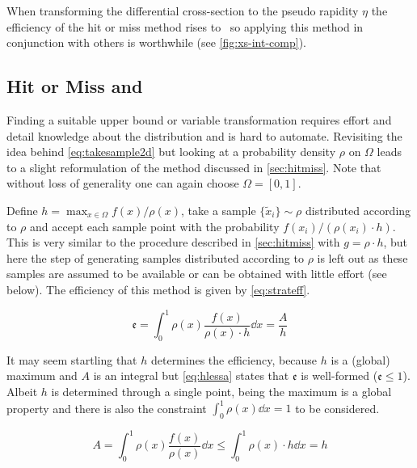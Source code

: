 When transforming the differential cross-section to the pseudo
rapidity \(\eta\) the efficiency of the hit or miss method rises
to~ so applying this method in conjunction
with others is worthwhile (see \cref{fig:xs-int-comp}).

\subsection{Hit or Miss and \vegas}%
\label{sec:stratsamp}

Finding a suitable upper bound or variable transformation requires
effort and detail knowledge about the distribution and is hard to
automate. Revisiting the idea behind \cref{eq:takesample2d} but
looking at a probability density \(\rho\) on \(\Omega\) leads to a
slight reformulation of the method discussed in
\cref{sec:hitmiss}. Note that without loss of generality one can again
choose \(\Omega = [0, 1]\).

Define \(h=\max_{x\in\Omega}f(x)/\rho(x)\), take a sample
\(\{\tilde{x}_i\}\sim\rho\) distributed according to \(\rho\) and
accept each sample point with the probability
\(f(x_i)/(\rho(x_i)\cdot h)\).  This is very similar to the procedure
described in \cref{sec:hitmiss} with \(g=\rho\cdot h\), but here the
step of generating samples distributed according to \(\rho\) is left
out as these samples are assumed to be available or can be obtained
with little effort (see below). The efficiency of this method is given
by \cref{eq:strateff}.

\begin{equation}
  \label{eq:strateff}
  \mathfrak{e} = \int_0^1\rho(x)\frac{f(x)}{\rho(x)\cdot h}\dd{x} = \frac{A}{h}
\end{equation}

It may seem startling that \(h\) determines the efficiency, because
\(h\) is a (global) maximum and \(A\) is an integral
but \cref{eq:hlessa} states that \(\mathfrak{e}\) is well-formed
(\(\mathfrak{e}\leq 1\)). Albeit \(h\) is determined through a single
point, being the maximum is a global property and there is also the
constraint \(\int_0^1\rho(x)\dd{x}=1\) to be considered.

\begin{equation}
  \label{eq:hlessa}
  A = \int_0^1\rho(x)\frac{f(x)}{\rho(x)}\dd{x} \leq
  \int_0^1\rho(x)\cdot h\dd{x} = h
\end{equation}

